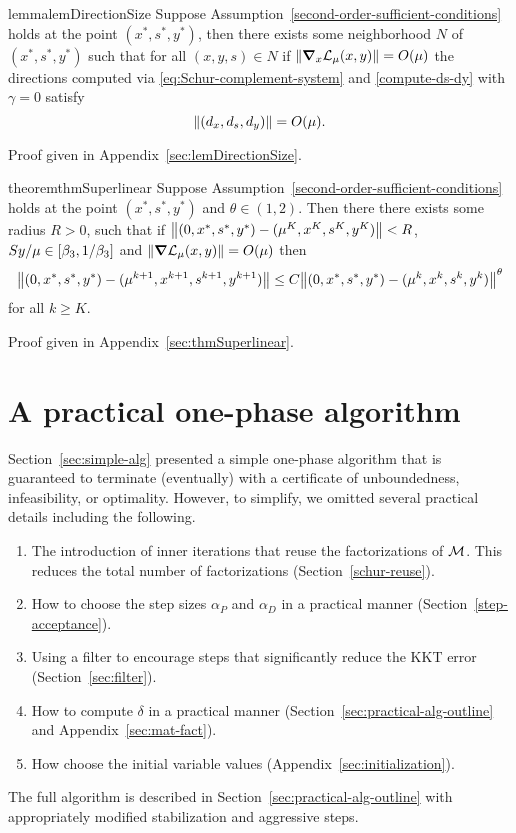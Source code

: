 \documentclass{article}
\begin{document}
\begin{restatable}{lemma}{lemDirectionSize}\label{lemDirectionSize}
Suppose Assumption~\ref{second-order-sufficient-conditions} holds at the point $(x^{*}, s^{*}, y^{*})$, then there exists some neighborhood $N$ of $(x^{*},s^{*},y^{*})$ such that for all $(x,y,s) \in N$ if $\| \grad_{x} \mathcal{L}_{\mu}(x,y) \|  = O(\mu)$ the directions computed via \eqref{eq:Schur-complement-system} and \eqref{compute-ds-dy} with  $\gamma = 0$ satisfy 
$$\| (d_{x}, d_{s}, d_{y}) \| =  O( \mu  ).$$
\end{restatable}

Proof given in Appendix~\ref{sec:lemDirectionSize}.

\begin{restatable}{theorem}{thmSuperlinear}\label{thmSuperlinear}
Suppose Assumption~\ref{second-order-sufficient-conditions} holds at the point $(x^{*}, s^{*}, y^{*})$ and $\theta \in (1,2)$. Then there there exists some radius $R > 0$, such that if  $\norm{ (0,x^{*},s^{*},y^{*}) - (\mu^K,x^K,s^K,y^K) } < R$, $Sy / \mu \in [\beta_{3}, 1/\beta_{3}]$
and $\norm{ \grad \mathcal{L}_{\mu}(x,y) } = O(\mu)$ 
then
$$
\norm{(0,x^{*},s^{*},y^{*}) - (\mu^{k+1},x^{k+1},s^{k+1},y^{k+1})} \le C \norm{ (0,x^{*},s^{*},y^{*}) - (\mu^{k},x^{k},s^{k},y^{k}) }^{\theta}
$$
for all $k \ge K$.
\end{restatable}

Proof given in Appendix~\ref{sec:thmSuperlinear}.

\fi

\section{A practical one-phase algorithm}\label{sec:practical-alg}

Section~\ref{sec:simple-alg} presented a simple one-phase algorithm that is guaranteed to terminate (eventually) with a certificate of unboundedness, infeasibility, or optimality. However, to simplify, we omitted several practical details including the following.
\begin{enumerate}
\item The introduction of inner iterations that reuse the factorizations of $\mathcal{M}$. This reduces the total number of factorizations (Section~\ref{schur-reuse}).
\item How to choose the step sizes $\alpha_{P}$ and $\alpha_{D}$ in a practical manner (Section~\ref{step-acceptance}).
\item Using a filter to encourage steps that significantly reduce the KKT error (Section~\ref{sec:filter}).
\item How to compute $\delta$ in a practical manner (Section~\ref{sec:practical-alg-outline} and Appendix~\ref{sec:mat-fact}).
\item How choose the initial variable values (Appendix~\ref{sec:initialization}).
\end{enumerate}
The full algorithm is described in Section~\ref{sec:practical-alg-outline} with appropriately modified stabilization and aggressive steps. 
\end{document}
